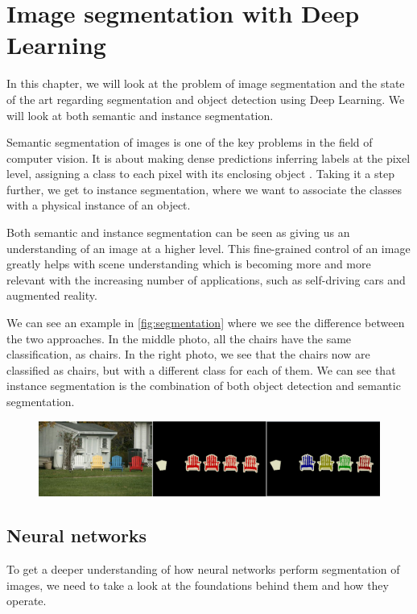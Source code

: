 \chapter{Image segmentation with Deep Learning}
In this chapter, we will look at the problem of image segmentation and the state of the art regarding segmentation and object detection using Deep Learning. We will look at both semantic and instance segmentation.

Semantic segmentation of images is one of the key problems in the field of computer vision. It is about making dense predictions inferring labels at the pixel level, assigning a class to each pixel with its enclosing object \cite{Garcia-Garcia2017}. Taking it a step further, we get to instance segmentation, where we want to associate the classes with a physical instance of an object. 

Both semantic and instance segmentation can be seen as giving us an understanding of an image at a higher level. This fine-grained control of an image greatly helps with scene understanding which is becoming more and more relevant with the increasing number of applications, such as self-driving cars and augmented reality. 

We can see an example in \autoref{fig:segmentation} where we see the difference between the two approaches. In the middle photo, all the chairs have the same classification, as chairs. In the right photo, we see that the chairs now are classified as chairs, but with a different class for each of them. We can see that instance segmentation is the combination of both object detection and semantic segmentation.

\begin{figure}[H]
    \centering
    \includegraphics[width=\linewidth]{fig/se.png}
    \label{fig:segmentation}
\end{figure}


\section{Neural networks}
To get a deeper understanding of how neural networks perform segmentation of images, we need to take a look at the foundations behind them and how they operate.

